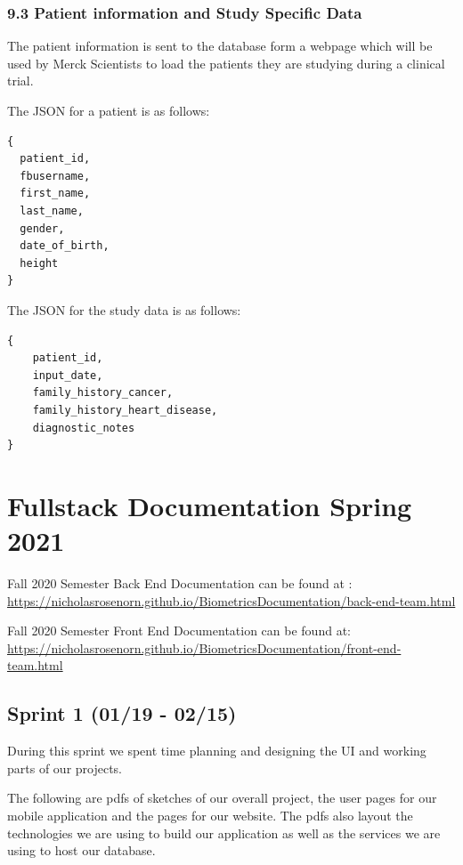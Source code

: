 \documentclass[]{book}
\begin{document}
\subsection{9.3 Patient information and Study Specific
Data}\label{patient-information-and-study-specific-data-1}

The patient information is sent to the database form a webpage which
will be used by Merck Scientists to load the patients they are studying
during a clinical trial.

The JSON for a patient is as follows:

\begin{verbatim}
{
  patient_id,
  fbusername,
  first_name,
  last_name,
  gender,
  date_of_birth,
  height
}
\end{verbatim}

The JSON for the study data is as follows:

\begin{verbatim}
{
    patient_id,
    input_date,
    family_history_cancer,
    family_history_heart_disease,
    diagnostic_notes
}
\end{verbatim}

\chapter{Fullstack Documentation Spring
2021}\label{fullstack-documentation-spring-2021}

Fall 2020 Semester Back End Documentation can be found at :
\url{https://nicholasrosenorn.github.io/BiometricsDocumentation/back-end-team.html}

Fall 2020 Semester Front End Documentation can be found at:
\url{https://nicholasrosenorn.github.io/BiometricsDocumentation/front-end-team.html}

\section{Sprint 1 (01/19 - 02/15)}\label{sprint-1-0119---0215}

During this sprint we spent time planning and designing the UI and
working parts of our projects.

The following are pdfs of sketches of our overall project, the user
pages for our mobile application and the pages for our website. The pdfs
also layout the technologies we are using to build our application as
well as the services we are using to host our database.
\end{document}
